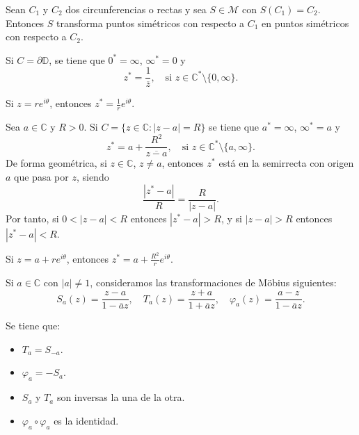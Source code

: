 \begin{lemma}
    Sean $C_1$ y $C_2$ dos circunferencias o rectas y sea $S \in \mathcal{M}$ con $S(C_1) = C_2$.
    Entonces $S$ transforma puntos simétricos con respecto a $C_1$ en puntos simétricos con respecto a $C_2$.
\end{lemma}

\begin{lemma}
    Si $C = \partial\mathbb{D}$, se tiene que $0^\ast = \infty$, $\infty^\ast = 0$ y
    $$z^\ast = \frac{1}{\overline{z}}, \quad \text{si } z \in \mathbb{C}^\ast \setminus \{0, \infty\}.$$
\end{lemma}

\begin{remark}
    Si $z = re^{i\theta}$, entonces $z^\ast = \frac{1}{r}e^{i\theta}$.
\end{remark}

\begin{lemma}
    Sea $a \in \mathbb{C}$ y $R > 0$.
    Si $C = \{z \in \mathbb{C} : |z-a| = R\}$ se tiene que $a^\ast = \infty$, $\infty^\ast = a$ y
    $$z^\ast = a + \frac{R^2}{\overline{z-a}}, \quad \text{si } z \in \mathbb{C}^\ast \setminus \{a, \infty\}.$$
    De forma geométrica, si $z \in \mathbb{C}$, $z \neq a$, entonces $z^\ast$ está en la semirrecta con origen $a$ que pasa por $z$, siendo
    $$\frac{|z^\ast-a|}{R} = \frac{R}{|z-a|}.$$
    Por tanto, si $0 < |z-a| < R$ entonces $|z^\ast-a| > R$, y si $|z-a| > R$ entonces $|z^\ast-a| < R$.
\end{lemma}

\begin{remark}
    Si $z = a + re^{i\theta}$, entonces $z^\ast = a + \frac{R^2}{r}e^{i\theta}$.
\end{remark}

\begin{notation}
    Si $a \in \mathbb{C}$ con $|a| \neq 1$, consideramos las transformaciones de Möbius siguientes:
    $$S_a(z) = \frac{z-a}{1-\overline{a}z}, \quad T_a(z) = \frac{z+a}{1+\overline{a}z}, \quad \varphi_a(z) = \frac{a-z}{1-\overline{a}z}.$$
\end{notation}

Se tiene que:
\begin{itemize}
    \item $T_a = S_{-a}$.
    \item $\varphi_a = -S_a$.
    \item $S_a$ y $T_a$ son inversas la una de la otra.
    \item $\varphi_a \circ \varphi_a$ es la identidad.
\end{itemize}

